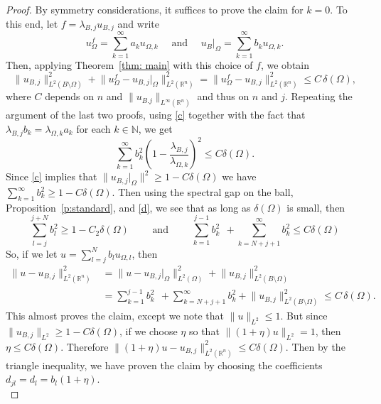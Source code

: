 \documentclass[10pt, reqno]{amsart}
\numberwithin{equation}{section}
\def\R{{\mathbb R}}
\def\W{\Omega}
\begin{document}
\begin{proof}
By symmetry considerations, it suffices to prove the claim for $k=0.$
To this end, let $f = \lambda_{B,j} u_{B,j}$ 
and write
\[
u_{\W}^f = \sum_{k=1}^{\infty} a_k u_{\W,k}
\quad \text{ and } \quad  
u_{B} \big|_{\W} = \sum_{k=1}^{\infty} b_k u_{\W,k}. 
\]
Then, applying Theorem~\ref{thm: main} with this choice of $f$, we obtain
\begin{equation}
    \label{c}
\big\|u_{B,j} \big\|^2_{L^2(B \setminus \W)} +  \big\| u_{\W}^f - u_{B,j} \big|_{\W}
\big\|^2_{L^2(\mathbb{R}^n)} =  \big\| u_{\W}^f - u_{B,j} \big\|^2_{L^2(\mathbb{R}^n)} \leq C\, \delta(\W), 
\end{equation}
where $C$ depends on $n$ and $\|u_{B.j}\|_{L^\infty(\R^n)}$ and thus on $n$ and $j$. Repeating the argument of the last two proofs, using  \eqref{c} together with the fact that $\lambda_{B,j} b_k = \lambda_{\W,k} a_k$ for each $k \in \mathbb{N}$, we get
\begin{equation}
    \label{d}
\sum_{k=1}^{\infty} b_k^2 \left(1 - \frac{\lambda_{B,j}}{\lambda_{\W,k}} \right)^2 \leq C \delta(\W). 
\end{equation}
Since \eqref{c} implies that $\big\|u_{B,j}\big|_{\W} \big\|^2\geq 1 - C \delta(\W)$ we have 
$
\sum_{k=1}^{\infty} b_k^2 \geq 1 - C \delta(\W). 
$
Then using the spectral gap on the ball, Proposition~\ref{p:standard}, and \eqref{d}, we see that as long as $\delta(\W)$ is small, then 
\[
\sum_{l=j}^{j+N} b_l^2 \geq 1 - C_2 \delta(\W) \qquad \text{ and }\qquad \sum_{k=1}^{j-1} b_k^2 \ \  +\! \! \sum_{k=N+j+1}^{\infty} \! \! \! \! \! b_k^2 \leq C \delta(\W)
\] 
So, if we let $u = \sum_{l=j}^N b_l u_{\W,l}$, then
\[
\begin{aligned}
\big\| u - u_{B,j} \big\|_{L^2(\mathbb{R}^n)}^2 
&=\big\| u - u_{B,j} \big|_{\W} \big\|_{L^2(\W)}^2 + \big\|u_{B,j} \big\|^2_{L^2(B \setminus \W)} \\
&= \sum_{k=1}^{j-1} b_k^2 \ \  +\! \! \sum_{k=N+j+1}^{\infty} \! \! \! \! \! b_k^2 + \big\|u_{B,j} \big\|^2_{L^2(B \setminus \W)} \leq C\, \delta(\W). 
\end{aligned}
\]
This almost proves the claim, except we note that $\| u \|_{L^2} \leq 1$. But since $\| u_{B,j} \|_{L^2}\geq 1 - C \delta(\W)$, if we choose $\eta$ so that $\|(1+\eta)u\|_{L^2}=1$, then $\eta \leq C \delta(\W) $. Therefore $\| (1+\eta)u - u_{B,j}\|_{L^2(\mathbb{R}^n)}^2 \leq C \delta(\W)$. Then by the triangle inequality, we have proven the claim by choosing the coefficients $d_{jl} = d_l=b_l(1+\eta)$.\\


\end{proof}
\end{document}
